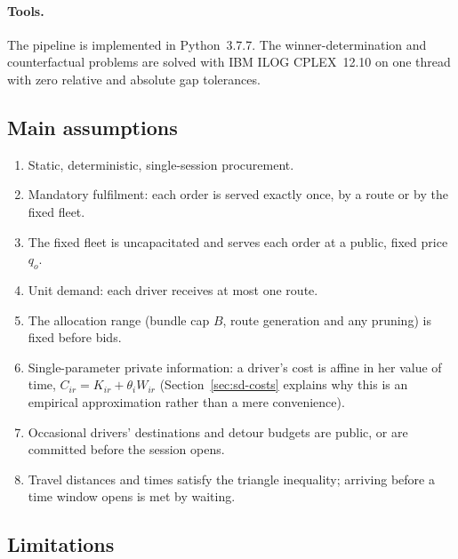 \paragraph{Tools.} The pipeline is implemented in Python~3.7.7. The
winner-determination and counterfactual problems are solved with
IBM ILOG CPLEX~12.10 on one thread with zero relative and absolute gap
tolerances.

\subsection{Main assumptions}

\begin{enumerate}[label=(\roman*),leftmargin=1cm,itemsep=2pt]
\item Static, deterministic, single-session procurement.
\item Mandatory fulfilment: each order is served exactly once, by a route or
by the fixed fleet.
\item The fixed fleet is uncapacitated and serves each order at a public,
fixed price $q_o$.
\item Unit demand: each driver receives at most one route.
\item The allocation range (bundle cap $B$, route generation and any
pruning) is fixed before bids.
\item Single-parameter private information: a driver's cost is affine in
her value of time, $C_{ir}=K_{ir}+\theta_iW_{ir}$
(Section~\ref{sec:sd-costs} explains why this is an empirical approximation
rather than a mere convenience).
\item Occasional drivers' destinations and detour budgets are public, or are
committed before the session opens.
\item Travel distances and times satisfy the triangle inequality; arriving
before a time window opens is met by waiting.
\end{enumerate}

\subsection{Limitations}

